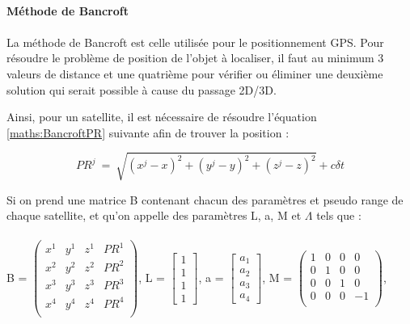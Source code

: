         \paragraph{Méthode de Bancroft}
            \paragraph*{}
            La méthode de Bancroft\cite{bancroft} est celle utilisée pour le positionnement GPS. Pour résoudre le problème de position de l'objet à localiser, il faut au minimum 3 valeurs de distance et une quatrième pour vérifier ou éliminer une deuxième solution qui serait possible à cause du passage 2D/3D.
            
            Ainsi, pour un satellite, il est nécessaire de résoudre l'équation \ref{maths:BancroftPR} suivante afin de trouver la position :
            
            \begin{equation}\label{maths:BancroftPR}
            PR^{j}\ =\ \sqrt{(x^{j} - x)^2 + (y^{j} - y)^2 + (z^{j} - z)^2} + c\delta t
            \end{equation}
            
           Si on prend une matrice B contenant chacun des paramètres et pseudo range de chaque satellite, et qu'on appelle des paramètres L, a, M et $\Lambda$ tels que : 
    
            \paragraph*{}
            B = 
            $\begin{pmatrix}
            x^1 & y^1 & z^1 & PR^1\\
            x^2 & y^2 & z^2 & PR^2\\
            x^3 & y^3 & z^3 & PR^3\\
            x^4 & y^4 & z^4 & PR^4\\
            \end{pmatrix}$,
            L =
            $\begin{bmatrix}
            1\\1\\1\\1
            \end{bmatrix}$,
            a = 
            $\begin{bmatrix}
            a_{1}\\a_{2}\\a_{3}\\a_{4}
            \end{bmatrix}$,
            M = 
            $\begin{pmatrix}
            1 & 0 & 0 & 0\\
            0 & 1 & 0 & 0\\
            0 & 0 & 1 & 0\\
            0 & 0 & 0 & -1\\
            \end{pmatrix}$,
            
